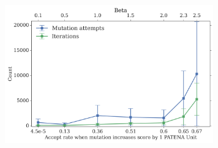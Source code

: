 \documentclass{beamer}
\begin{document}
\begin{frame}
\begin{adjustwidth}{-1.5em}{-2.5em}
\includegraphics[width=340px,height=250px]{../img/beta-vs-Mut-iterations}\\
\end{adjustwidth}
\end{frame}








% 
% 
\end{document}

